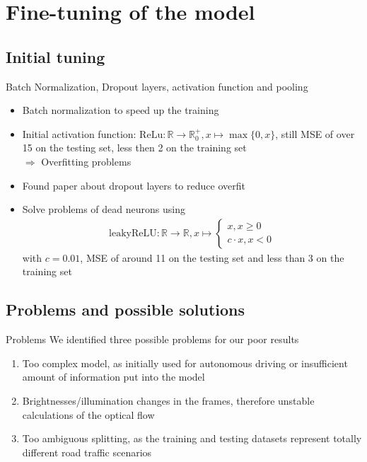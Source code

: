 \section{Fine-tuning of the model}
\subsection{Initial tuning}

\begin{frame}{Batch Normalization, Dropout layers, activation function and pooling}
\begin{itemize}
\item Batch normalization to speed up the training \cite{BatchNorm2015}
\item Initial activation function: $\mathrm{ReLu}: \mathbb{R} \to \mathbb{R}_0^+, x \mapsto \max\{0,x\}$, still MSE of over 15 on the testing 
set, less then 2 on the training set\\
$\Rightarrow$ Overfitting problems
\item Found paper about dropout layers \cite{Dropout2014} to reduce overfit
\item Solve problems of dead neurons using
\begin{align*}
\mathrm{leakyReLU} : \mathbb{R} \to \mathbb{R}, x \mapsto \begin{cases}
x, x \geq 0\\
c \cdot x, x <0
\end{cases}
\end{align*}
with $c = 0.01$, MSE of around 11 on the testing set and less than 3 on the training set
\end{itemize}
\end{frame}
\subsection{Problems and possible solutions}
\begin{frame}{Problems}
We identified three possible problems for our poor results
\begin{enumerate}
\item Too complex model, as initially used for autonomous driving or insufficient amount of information put into the model
\item Brightnesses/illumination changes in the frames, therefore unstable calculations of the optical flow
\item Too ambiguous splitting, as the training and testing datasets represent totally different road traffic scenarios
\end{enumerate}
\end{frame}

